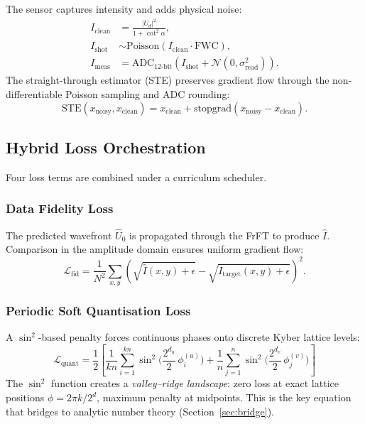 \documentclass[11pt, a4paper]{article}
\theoremstyle{definition}
\theoremstyle{plain}
\newcommand{\STE}{\mathrm{STE}}
\begin{document}
The sensor captures intensity and adds physical noise:
\begin{align}
  I_{\mathrm{clean}} &= \frac{|U_d|^2}{1 + \cot^2\!\alpha},
  \label{eq:intensity}\\
  I_{\mathrm{shot}} &\sim \mathrm{Poisson}(I_{\mathrm{clean}} \cdot \mathrm{FWC}),
  \label{eq:poisson}\\
  I_{\mathrm{meas}} &= \mathrm{ADC}_{12\text{-bit}}
  (I_{\mathrm{shot}} + \mathcal{N}(0, \sigma_{\mathrm{read}}^2)).
  \label{eq:adc}
\end{align}
The straight-through estimator (STE) preserves gradient flow through the
non-differentiable Poisson sampling and ADC rounding:
\begin{equation}
  \STE(x_{\text{noisy}}, x_{\text{clean}}) =
  x_{\text{clean}} + \mathrm{stopgrad}(x_{\text{noisy}} - x_{\text{clean}}).
  \label{eq:ste}
\end{equation}


\subsection{Hybrid Loss Orchestration}
\label{sec:loss}

Four loss terms are combined under a curriculum scheduler.

\subsubsection{Data Fidelity Loss}
The predicted wavefront $\hat{U}_0$ is propagated through the FrFT to
produce $\hat{I}$. Comparison in the amplitude domain ensures uniform
gradient flow:
\begin{equation}
  \mathcal{L}_{\mathrm{fid}} = \frac{1}{N^2}\sum_{x,y}
  \left(\sqrt{\hat{I}(x,y) + \epsilon} -
  \sqrt{I_{\mathrm{target}}(x,y) + \epsilon}\right)^{\!2}.
  \label{eq:loss_fid}
\end{equation}

\subsubsection{Periodic Soft Quantisation Loss}
A $\sin^2$-based penalty forces continuous phases onto discrete Kyber
lattice levels:
\begin{equation}
\boxed{
  \mathcal{L}_{\mathrm{quant}} = \frac{1}{2}\!\left[
    \frac{1}{kn}\sum_{i=1}^{kn}
    \sin^2\!\Big(\frac{2^{d_u}}{2}\,\phi_i^{(u)}\Big) +
    \frac{1}{n}\sum_{j=1}^{n}
    \sin^2\!\Big(\frac{2^{d_v}}{2}\,\phi_j^{(v)}\Big)
  \right]
}
\label{eq:loss_quant}
\end{equation}
The $\sin^2$ function creates a \textit{valley--ridge landscape}: zero
loss at exact lattice positions $\phi = 2\pi k / 2^d$, maximum penalty
at midpoints. This is the key equation that bridges to analytic number
theory (Section~\ref{sec:bridge}).
\end{document}
